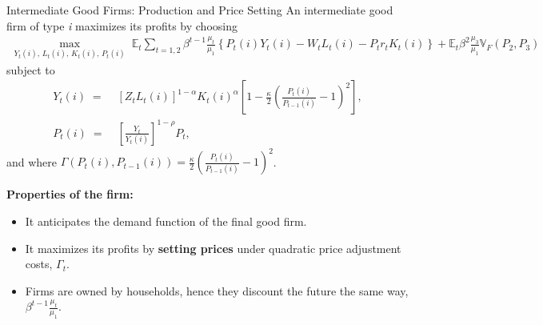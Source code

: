 \documentclass[10pt,c,aspectratio=1610,handout]{beamer}
\begin{document}
\begin{frame}{Intermediate Good Firms: Production and Price Setting}%
  An intermediate good firm of type \textit{i} maximizes its profits by choosing%
  \begin{align*}%
    \max_{Y_t(i), \, L_t(i), \, K_t(i), \, P_t(i)} \; \mathbb{E}_t \sum_{t=1,2} \beta^{t-1} \frac{\mu_t}{\mu_1} \left\{ P_t(i) Y_t(i) - W_t L_t(i) - {P}_t r_t K_t(i) \right\} + \mathbb{E}_t \beta^2 \frac{\mu_3}{\mu_1} \mathbb{V}_F \left(P_2, P_3\right)%
  \end{align*}%
  subject to%
  \begin{align*}%
    Y_t(i) \; = & \; \left[Z_t L_t(i)\right]^{1-\alpha} K_t(i)^\alpha \left[ 1 - \frac{\kappa}{2} \left( \frac{P_t(i)}{P_{t-1}(i)} - 1 \right)^2 \right],\\%
    P_t(i) \; = & \; \left[\frac{Y_t}{Y_t(i)}\right]^{1-\rho} {P}_t,%
  \end{align*}%
  and where $\Gamma \left( P_t(i),P_{t-1}(i) \right) = \frac{\kappa}{2} \left( \frac{P_t(i)}{P_{t-1}(i)} - 1 \right)^2$.\\%
  \pause%
  \vspace*{0.1in}%
  \begin{small}%
    \textbf{Properties of the firm:}%
    \begin{itemize}%
      \item[$\blacktriangleright$] It anticipates the demand function of the final good firm.%
      \pause%
      \item[$\blacktriangleright$] It maximizes its profits by \textbf{setting prices} under quadratic price adjustment costs, $\Gamma_t$.%
      \item[$\blacktriangleright$] Firms are owned by households, hence they discount the future the same way, $\beta^{t-1} \frac{\mu_t}{\mu_1}$.%
    \end{itemize}%
  \end{small}%
  \vspace*{-0.2in}%
\end{frame}%
\end{document}
